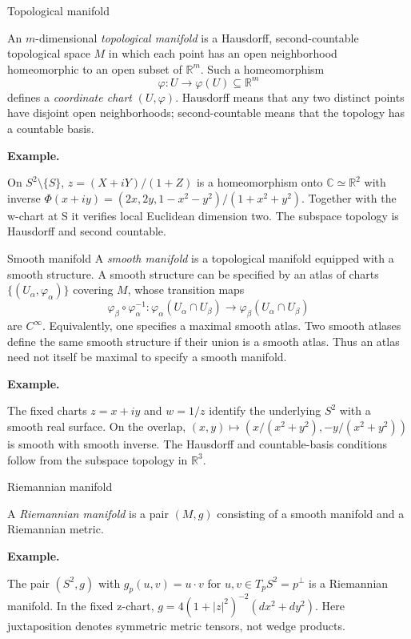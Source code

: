 \documentclass[11pt]{article}
\makeatletter
\newcommand{\R}{\mathbb R}
\newcommand{\C}{\mathbb C}
\newcounter{definition}
\newcommand{\exampleheading}{\par\medskip\textbf{Example.}\par\smallskip}
\newcommand{\currentdefinition}[1]{\protected@edef\@currentlabel{#1}}
\makeatother
\begin{document}
\begin{definitionbox}{Topological manifold}
\currentdefinition{\thedefinition}
\label{source:S06}

An $m$-dimensional \emph{topological manifold} is a Hausdorff,
second-countable topological space $M$ in which each point has an open
neighborhood homeomorphic to an open subset of $\R^m$.
Such a homeomorphism
\[
\varphi:U\longrightarrow\varphi(U)\subseteq\R^m
\]
defines a \emph{coordinate chart} $(U,\varphi)$.
Hausdorff means that any two distinct points have disjoint open
neighborhoods; second-countable means that the topology has a countable basis.


\exampleheading
On $S^2\setminus\{S\}$, $z=(X+iY)/(1+Z)$ is a homeomorphism onto $\C\simeq\R^2$ with inverse $\Phi(x+iy)=(2x,2y,1-x^2-y^2)/(1+x^2+y^2)$. Together with the w-chart at S it verifies local Euclidean dimension two. The subspace topology is Hausdorff and second countable.
\end{definitionbox}

\begin{definitionbox}{Smooth manifold}
\currentdefinition{\thedefinition}
\label{source:S07}
\label{def:06-04}
A \emph{smooth manifold} is a topological manifold equipped with a smooth
structure. A smooth structure can be specified by an atlas of charts
$\{(U_\alpha,\varphi_\alpha)\}$ covering $M$, whose transition maps
\[
\varphi_\beta\circ\varphi_\alpha^{-1}:
\varphi_\alpha(U_\alpha\cap U_\beta)
\longrightarrow\varphi_\beta(U_\alpha\cap U_\beta)
\]
are $C^\infty$. Equivalently, one specifies a maximal smooth atlas.
Two smooth atlases define the same smooth structure if their union is a
smooth atlas. Thus an atlas need not itself be maximal to specify a
smooth manifold.


\exampleheading
The fixed charts $z=x+iy$ and $w=1/z$ identify the underlying $S^2$ with a smooth real surface. On the overlap, $(x,y)\mapsto(x/(x^2+y^2),-y/(x^2+y^2))$ is smooth with smooth inverse. The Hausdorff and countable-basis conditions follow from the subspace topology in $\R^3$.
\end{definitionbox}

\newpage
\begin{definitionbox}{Riemannian manifold}
\currentdefinition{\thedefinition}
\label{source:S08}

A \emph{Riemannian manifold} is a pair $(M,g)$ consisting of a smooth
manifold and a Riemannian metric.

\exampleheading
The pair $(S^2,g)$ with $g_p(u,v)=u\cdot v$ for $u,v\in T_pS^2=p^\perp$ is a Riemannian manifold. In the fixed z-chart, $g=4(1+|z|^2)^{-2}(dx^2+dy^2)$. Here juxtaposition denotes symmetric metric tensors, not wedge products.
\end{definitionbox}
\end{document}

